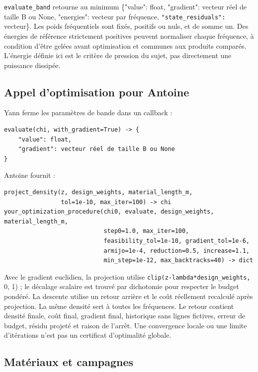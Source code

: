 \documentclass[11pt,a4paper]{article}
\begin{document}
{\small\ttfamily \nolinkurl{evaluate_band}} retourne au minimum {\small\ttfamily \{"value": float, "gradient": vecteur réel de taille B ou None, "energies": vecteur par fréquence, \nolinkurl{"state_residuals":} vecteur\}}. Les poids fréquentiels sont fixés, positifs ou nuls, et de somme un. Des énergies de référence strictement positives peuvent normaliser chaque fréquence, à condition d'être gelées avant optimisation et communes aux produits comparés. L'énergie définie ici est le critère de pression du sujet, pas directement une puissance dissipée.

\subsection{Appel d'optimisation pour Antoine}

Yann ferme les paramètres de bande dans un callback :

\begin{Verbatim}[breaklines,breakanywhere,fontsize=\footnotesize]
evaluate(chi, with_gradient=True) -> {
    "value": float,
    "gradient": vecteur réel de taille B ou None
}
\end{Verbatim}

Antoine fournit :

\begin{Verbatim}[breaklines,breakanywhere,fontsize=\footnotesize]
project_density(z, design_weights, material_length_m,
                tol=1e-10, max_iter=100) -> chi
your_optimization_procedure(chi0, evaluate, design_weights, material_length_m,
                            step0=1.0, max_iter=100,
                            feasibility_tol=1e-10, gradient_tol=1e-6,
                            armijo=1e-4, reduction=0.5, increase=1.1,
                            min_step=1e-12, max_backtracks=40) -> dict
\end{Verbatim}

Avec le gradient euclidien, la projection utilise {\small\ttfamily \nolinkurl{clip(z-lambda*design_weights,} 0, 1)} ; le décalage scalaire est trouvé par dichotomie pour respecter le budget pondéré. La descente utilise un retour arrière et le coût réellement recalculé après projection. La même densité sert à toutes les fréquences. Le retour contient densité finale, coût final, gradient final, historique sans lignes fictives, erreur de budget, résidu projeté et raison de l'arrêt. Une convergence locale ou une limite d'itérations n'est pas un certificat d'optimalité globale.

\subsection{Matériaux et campagnes}
\end{document}
